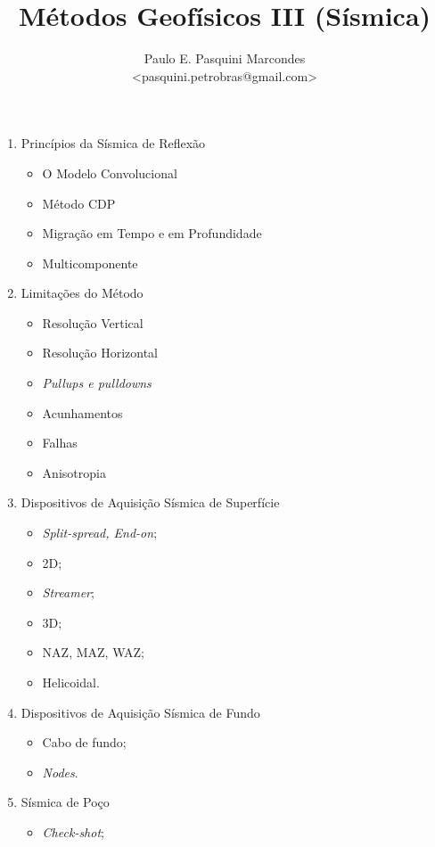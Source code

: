 \documentclass[a4paper,11pt]{scrartcl}
\title{M\'etodos Geof\'isicos III (S\'ismica)}
\author{Paulo E. Pasquini Marcondes \\<pasquini.petrobras@gmail.com>}
\begin{document}
\maketitle


\begin{enumerate}
\item Princ\'ipios da S\'ismica de Reflex\~ao
	\begin{itemize}
	\item O Modelo Convolucional
	\item M\'etodo CDP 
	\item Migra\c{c}\~ao em Tempo e em Profundidade
	\item Multicomponente
	\end{itemize}
\item Limita\c{c}\~oes do M\'etodo
	\begin{itemize}
	\item Resolu\c{c}\~ao Vertical
	\item Resolu\c{c}\~ao Horizontal
	\item \emph{Pullups e pulldowns}
	\item Acunhamentos
	\item Falhas
	\item Anisotropia
	\end{itemize}
\item Dispositivos de Aquisi\c{c}\~ao S\'ismica de Superf\'icie
	\begin{itemize}
	\item \emph{Split-spread, End-on};
	\item 2D;
	\item \emph{Streamer};
	\item 3D;
	\item NAZ, MAZ, WAZ;
	\item Helicoidal.
	\end{itemize}
\item Dispositivos de Aquisi\c{c}\~ao S\'ismica de Fundo
	\begin{itemize}
	\item Cabo de fundo;
	\item \emph{Nodes}.
	\end{itemize}
\item S\'ismica de Po\c{c}o
	\begin{itemize}
	\item \emph{Check-shot};

\end{itemize}
\end{enumerate}
\end{document}
